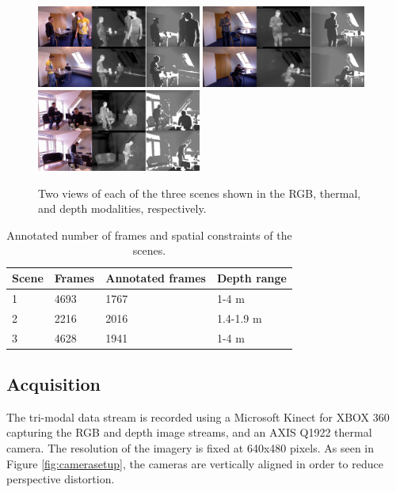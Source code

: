 \documentclass[10pt,twocolumn,letterpaper]{article}
\begin{document}
\begin{figure}[htbp]
	\centering
		\includegraphics[width=0.48\textwidth]{Selection/1.png}
		\includegraphics[width=0.48\textwidth]{Selection/2.png}
		\includegraphics[width=0.48\textwidth]{Selection/3.png}
	\caption{Two views of each of the three scenes shown in the RGB, thermal, and depth modalities, respectively.}
	\label{fig:samplescenes}
\end{figure}

\begin{table}[htpb]
\centering
\begin{tabular}{llll}
\hline
Scene & Frames 	& Annotated frames 	& Depth range \\ \hline
1 		& 4693		& 1767	 						& 1-4 m \\
2 		& 2216		& 2016	 						& 1.4-1.9 m \\
3 		& 4628		& 1941	 						& 1-4 m \\ 
\hline
\end{tabular}
\caption{Annotated number of frames and spatial constraints of the scenes.}
\label{tab:scenes}
\end{table}


\subsection{Acquisition}
\label{sec:setup}
The tri-modal data stream is recorded using a Microsoft Kinect for XBOX 360 capturing the RGB and depth image streams, and an AXIS Q1922 thermal camera. The resolution of the imagery is fixed at 640x480 pixels. As seen in Figure \ref{fig:camerasetup}, the cameras are vertically aligned in order to reduce perspective distortion. 
\end{document}
